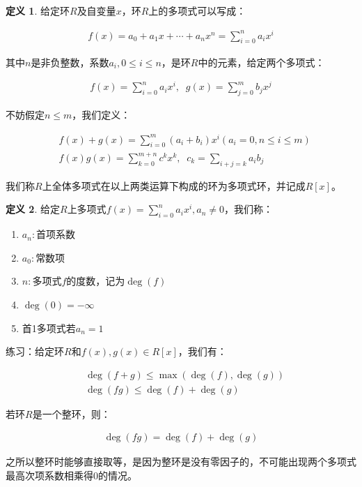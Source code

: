 \documentclass[12pt, a4paper, oneside]{ctexart}
\theoremstyle{definition}
\newtheorem*{definition}{定义}
\begin{document}
\begin{definition}
给定环$R$及自变量$x$，环$R$上的多项式可以写成：

\begin{align*}
f(x)=a_0+a_1x+\cdots +a_nx^n=\sum_{i=0}^n a_ix^i
\end{align*}

其中$n$是非负整数，系数$a_i,0\leqslant i\leqslant n$，是环$R$中的元素，给定两个多项式：

\begin{align*}
f(x)=\sum_{i=0}^n a_ix^i,\;\;g(x)=\sum_{j=0}^m b_jx^j
\end{align*}

不妨假定$n\leqslant m$，我们定义：

\begin{align*}
&f(x)+g(x)=\sum_{i=0}^m(a_i+b_i)x^i (a_i=0,n\leqslant i\leqslant m)\\
&f(x)g(x)=\sum_{k=0}^{m+n}c^kx^k,\;\;c_k=\sum_{i+j=k}a_ib_j
\end{align*}

我们称$R$上全体多项式在以上两类运算下构成的环为多项式环，并记成$R[x]$。
\end{definition}

\begin{definition}
给定$R$上多项式$f(x)=\sum_{i=0}^na_ix^i,a_n\neq 0$，我们称：
\begin{enumerate}
\item $a_n:$首项系数
\item $a_0:$常数项
\item $n:$多项式$f$的度数，记为$\deg(f)$
\item $\deg(0)=-\infty$
\item 首1多项式若$a_n=1$
\end{enumerate}
\end{definition}

练习：给定环$R$和$f(x),g(x)\in R[x]$，我们有：

\begin{align*}
&\deg(f+g)\leqslant \max(\deg(f),\deg(g))\\
&\deg(fg)\leqslant \deg(f)+\deg(g)
\end{align*}

若环$R$是一个整环，则：

\begin{align*}
    \deg(fg)=\deg(f)+\deg(g)
\end{align*}

之所以整环时能够直接取等，是因为整环是没有零因子的，不可能出现两个多项式最高次项系数相乘得0的情况。
\end{document}
